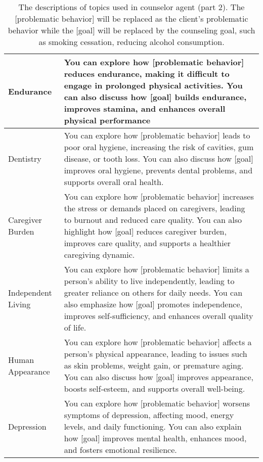 \begin{table*}[tb]
\begin{tabularx}{\textwidth}{lX}
Endurance                   & You can explore how [problematic behavior] reduces endurance, making it difficult to engage in prolonged physical activities. You can also discuss how [goal] builds endurance, improves stamina, and enhances overall physical performance                                                                                                                                                                                        \\ \hline
Dentistry                   & You can explore how [problematic behavior] leads to poor oral hygiene, increasing the risk of cavities, gum disease, or tooth loss. You can also discuss how [goal] improves oral hygiene, prevents dental problems, and supports overall oral health.                                                                                                                                                                             \\ \hline
Caregiver Burden            & You can explore how [problematic behavior] increases the stress or demands placed on caregivers, leading to burnout and reduced care quality. You can also highlight how [goal] reduces caregiver burden, improves care quality, and supports a healthier caregiving dynamic.                                                                                                                                                      \\ \hline
Independent Living          & You can explore how [problematic behavior] limits a person’s ability to live independently, leading to greater reliance on others for daily needs. You can also emphasize how [goal] promotes independence, improves self-sufficiency, and enhances overall quality of life.                                                                                                                                                       \\ \hline
Human Appearance            & You can explore how [problematic behavior] affects a person’s physical appearance, leading to issues such as skin problems, weight gain, or premature aging. You can also discuss how [goal] improves appearance, boosts self-esteem, and supports overall well-being.                                                                                                                                                             \\ \hline
Depression                  & You can explore how [problematic behavior] worsens symptoms of depression, affecting mood, energy levels, and daily functioning. You can also explain how [goal] improves mental health, enhances mood, and fosters emotional resilience. 
\\ \bottomrule
\end{tabularx}
\caption{The descriptions of topics used in counselor agent (part 2). The [problematic behavior] will be replaced as the client's problematic behavior while the [goal] will be replaced by the counseling goal, such as smoking cessation, reducing alcohol consumption.}
\label{tab:counselor topic description 2}
\end{table*}

